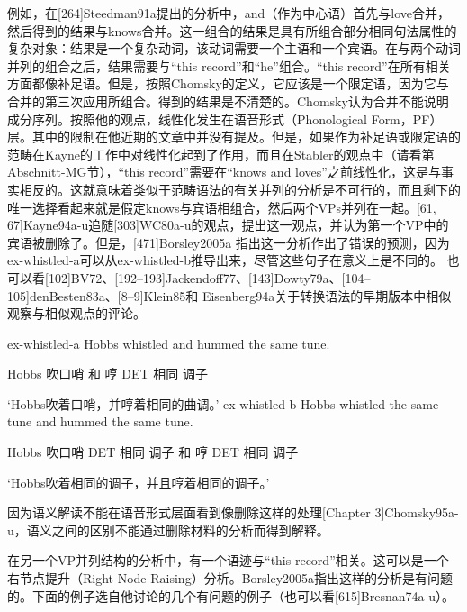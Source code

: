 例如，在[264]Steedman91a提出的分析中，and（作为中心语）首先与love合并，然后得到的结果与knows合并。这一组合的结果是具有所组合部分相同句法属性的复杂对象：结果是一个复杂动词，该动词需要一个主语和一个宾语。在与两个动词并列的组合之后，结果需要与“this record”和“he”组合。“this record”在所有相关方面都像补足语。但是，按照Chomsky的定义，它应该是一个限定语，因为它与合并的第三次应用所组合。得到的结果是不清楚的。Chomsky认为合并不能说明成分序列。按照他的观点，线性化发生在语音形式（Phonological Form，PF）层。其中的限制在他近期的文章中并没有提及。但是，如果作为补足语或限定语的范畴在Kayne的工作中对线性化起到了作用，而且在Stabler的观点中（请看第 Abschnitt-MG节），“this record”需要在“knows and loves”之前线性化，这是与事实相反的。这就意味着类似于范畴语法的有关并列的分析是不可行的，而且剩下的唯一选择看起来就是假定knows与宾语相组合，然后两个VPs并列在一起。[61, 67]Kayne94a-u追随[303]WC80a-u的观点，提出这一观点，并认为第一个VP中的宾语被删除了。但是，[471]Borsley2005a 指出这一分析作出了错误的预测，因为ex-whistled-a可以从ex-whistled-b推导出来，尽管这些句子在意义上是不同的。 
也可以看[102]BV72、[192--193]Jackendoff77、[143]Dowty79a、[104--105]denBesten83a、[8--9]Klein85和 Eisenberg94a关于转换语法的早期版本中相似观察与相似观点的评论。
























ex-whistled-a 
Hobbs whistled and hummed the same tune.

Hobbs 吹口哨 和 哼 DET 相同 调子

`Hobbs吹着口哨，并哼着相同的曲调。'
ex-whistled-b 
Hobbs whistled the same tune and hummed the same tune.

Hobbs 吹口哨 DET 相同 调子 和 哼 DET 相同 调子

`Hobbs吹着相同的调子，并且哼着相同的调子。'

因为语义解读不能在语音形式层面看到像删除这样的处理[Chapter 3]Chomsky95a-u，语义之间的区别不能通过删除材料的分析而得到解释。




在另一个VP并列结构的分析中，有一个语迹与“this record”相关。这可以是一个右节点提升（Right-Node-Raising）分析。Borsley2005a指出这样的分析是有问题的。下面的例子选自他讨论的几个有问题的例子（也可以看[615]Bresnan74a-u）。






